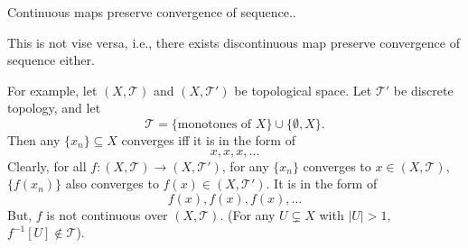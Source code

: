 \begin{lemma}
	Continuous maps preserve convergence of sequence..
\end{lemma}


\begin{note}
	This is not vise versa, i.e., there exists discontinuous map preserve convergence of sequence either.
	
	For example, let $(X, \mathcal T)$ and $(X, \mathcal T')$ be topological space. Let $\mathcal T'$ be discrete topology, and let
	$$
	\mathcal T = \{ \text{monotones of $X$} \} \cup \{ \emptyset, X \}.
	$$
	Then any $\{x_n\} \subseteq X$ converges iff it is in the form of
	$$
	x, x, x, \ldots
	$$
	Clearly, for all $f:(X, \mathcal T) \to (X, \mathcal T')$, for any $\{x_n\}$ converges to $x \in (X, \mathcal T)$, $\{f(x_n)\}$ also converges to $f(x) \in (X, \mathcal T')$. It is in the form of
	$$
	f(x), f(x), f(x), \ldots
	$$
	But, $f$ is not continuous over $(X, \mathcal T)$. (For any $U \subsetneq X$ with $|U|>1$, $f^{-1}[U] \notin \mathcal T$).
\end{note}
























%